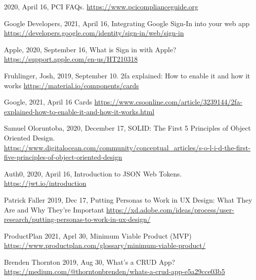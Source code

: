 \begin{thebibliography}{9} 
    2020, April 16,
    PCI FAQs.
    \url{https://www.pcicomplianceguide.org}

    Google Developers,
    2021, April 16,
    Integrating Google Sign-In into your web app
    \url{https://developers.google.com/identity/sign-in/web/sign-in}

    Apple,
    2020, September 16,
    What is Sign in with Apple?
    \url{https://support.apple.com/en-us/HT210318}

    Fruhlinger, Josh,
    2019, September 10.
    2fa explained: How to enable it and how it works
    \url{https://material.io/components/cards}

    Google,
    2021, April 16 
    Cards
    \url{https://www.csoonline.com/article/3239144/2fa-explained-how-to-enable-it-and-how-it-works.html}

    Samuel Oloruntoba,
    2020, December 17,
    SOLID: The First 5 Principles of Object Oriented Design.
    \url{https://www.digitalocean.com/community/conceptual_articles/s-o-l-i-d-the-first-five-principles-of-object-oriented-design}

    Auth0,
    2020, April 16,
    Introduction to JSON Web Tokens.
    \url{https://jwt.io/introduction}

    Patrick Faller
    2019, Dec 17,
    Putting Personas to Work in UX Design: What They Are and Why They’re Important
    \url{https://xd.adobe.com/ideas/process/user-research/putting-personas-to-work-in-ux-design/}

    ProductPlan
    2021, Aprl 30,
    Minimum Viable Product (MVP)
    \url{https://www.productplan.com/glossary/minimum-viable-product/}

    Brenden Thornton
    2019, Aug 30,
    What’s a CRUD App?
    \url{https://medium.com/@thorntonbrenden/whats-a-crud-app-e5a29cce03b5}
\end{thebibliography}
